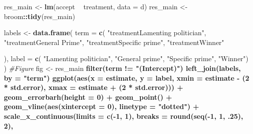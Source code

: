 \documentclass[]{book}
\newenvironment{Shaded}{\begin{snugshade}}{\end{snugshade}}
\newcommand{\KeywordTok}[1]{\textcolor[rgb]{0.13,0.29,0.53}{\textbf{#1}}}
\newcommand{\DataTypeTok}[1]{\textcolor[rgb]{0.13,0.29,0.53}{#1}}
\newcommand{\DecValTok}[1]{\textcolor[rgb]{0.00,0.00,0.81}{#1}}
\newcommand{\StringTok}[1]{\textcolor[rgb]{0.31,0.60,0.02}{#1}}
\newcommand{\CommentTok}[1]{\textcolor[rgb]{0.56,0.35,0.01}{\textit{#1}}}
\newcommand{\OperatorTok}[1]{\textcolor[rgb]{0.81,0.36,0.00}{\textbf{#1}}}
\newcommand{\NormalTok}[1]{#1}
\begin{document}
\begin{Shaded}
\begin{Highlighting}[]
\NormalTok{res_main <-}\StringTok{  }\KeywordTok{lm}\NormalTok{(accept }\OperatorTok{~}\StringTok{ }\NormalTok{treatment, }\DataTypeTok{data =}\NormalTok{ d) }
\NormalTok{res_main <-}\StringTok{ }\NormalTok{broom}\OperatorTok{::}\KeywordTok{tidy}\NormalTok{(res_main)}

\NormalTok{labels <-}\StringTok{ }\KeywordTok{data.frame}\NormalTok{(}
  \DataTypeTok{term =} \KeywordTok{c}\NormalTok{(}
    \StringTok{"treatmentLamenting politician"}\NormalTok{,}
    \StringTok{"treatmentGeneral Prime"}\NormalTok{,}
    \StringTok{"treatmentSpecific prime"}\NormalTok{,}
    \StringTok{"treatmentWinner"}
    
\NormalTok{  ),}
  \DataTypeTok{label =} \KeywordTok{c}\NormalTok{( }\StringTok{"Lamenting politician"}\NormalTok{,}
             \StringTok{"General prime"}\NormalTok{,}
             \StringTok{"Specific prime"}\NormalTok{,}
             \StringTok{"Winner"}\NormalTok{)}
\NormalTok{)}
\CommentTok{#Figure}
\NormalTok{fig <-}\StringTok{   }\NormalTok{res_main }\OperatorTok{%>%}
\StringTok{  }\KeywordTok{filter}\NormalTok{(term }\OperatorTok{!=}\StringTok{ "(Intercept)"}\NormalTok{) }\OperatorTok{%>%}\StringTok{ }
\StringTok{  }\KeywordTok{left_join}\NormalTok{(labels, }\DataTypeTok{by =} \StringTok{"term"}\NormalTok{) }\OperatorTok{%>%}\StringTok{ }
\StringTok{  }
\StringTok{  }\KeywordTok{ggplot}\NormalTok{(}\KeywordTok{aes}\NormalTok{(}\DataTypeTok{x =}\NormalTok{ estimate, }\DataTypeTok{y =}\NormalTok{ label,}
             \DataTypeTok{xmin =}\NormalTok{ estimate }\OperatorTok{-}\StringTok{ }\NormalTok{(}\DecValTok{2} \OperatorTok{*}\StringTok{ }\NormalTok{std.error),}
             \DataTypeTok{xmax =}\NormalTok{ estimate }\OperatorTok{+}\StringTok{ }\NormalTok{(}\DecValTok{2} \OperatorTok{*}\StringTok{ }\NormalTok{std.error))) }\OperatorTok{+}
\StringTok{   }\KeywordTok{geom_errorbarh}\NormalTok{(}\DataTypeTok{height =} \DecValTok{0}\NormalTok{) }\OperatorTok{+}
\StringTok{  }\KeywordTok{geom_point}\NormalTok{() }\OperatorTok{+}
\StringTok{  }\KeywordTok{geom_vline}\NormalTok{(}\KeywordTok{aes}\NormalTok{(}\DataTypeTok{xintercept =} \DecValTok{0}\NormalTok{), }\DataTypeTok{linetype =} \StringTok{"dotted"}\NormalTok{) }\OperatorTok{+}
\StringTok{  }\KeywordTok{scale_x_continuous}\NormalTok{(}\DataTypeTok{limits =} \KeywordTok{c}\NormalTok{(}\OperatorTok{-}\DecValTok{1}\NormalTok{, }\DecValTok{1}\NormalTok{),}
                     \DataTypeTok{breaks =} \KeywordTok{round}\NormalTok{(}\KeywordTok{seq}\NormalTok{(}\OperatorTok{-}\DecValTok{1}\NormalTok{, }\DecValTok{1}\NormalTok{, .}\DecValTok{25}\NormalTok{), }\DecValTok{2}\NormalTok{),}
}}}
\end{Highlighting}
\end{Shaded}
\end{document}
